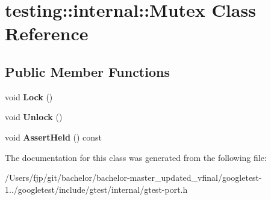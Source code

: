 \hypertarget{classtesting_1_1internal_1_1_mutex}{}\section{testing\+:\+:internal\+:\+:Mutex Class Reference}
\label{classtesting_1_1internal_1_1_mutex}
\subsection*{Public Member Functions}
\begin{DoxyCompactItemize}
\item 
\mbox{\label{classtesting_1_1internal_1_1_mutex_ae7e2191886c00182176b23c4f4d049f8}} 
void {\bfseries Lock} ()
\item 
\mbox{\label{classtesting_1_1internal_1_1_mutex_a315188055de1be98884519ad84eff2e6}} 
void {\bfseries Unlock} ()
\item 
\mbox{\label{classtesting_1_1internal_1_1_mutex_af45bf1660ac4110338a02a8680b2f486}} 
void {\bfseries Assert\+Held} () const
\end{DoxyCompactItemize}


The documentation for this class was generated from the following file\+:\begin{DoxyCompactItemize}
\item 
/\+Users/fjp/git/bachelor/bachelor-\/master\+\_\+updated\+\_\+vfinal/googletest-\/1../googletest/include/gtest/internal/gtest-\/port.\+h\end{DoxyCompactItemize}
